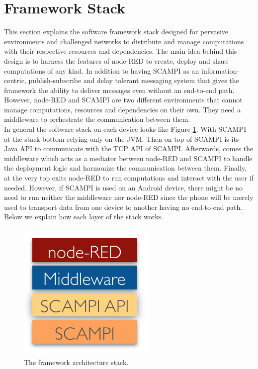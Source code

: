 \section{Framework Stack}\label{sec:stack}
This section explains the software framework stack designed for pervasive environments and challenged networks to distribute and manage computations with their respective resources and dependencies.  The main idea behind this design is to harness the features of node-RED to create, deploy and share computations of any kind. In addition to having SCAMPI as an information-centric, publish-subscribe and delay tolerant messaging system that gives the framework the ability to deliver messages even without an end-to-end path. However, node-RED and SCAMPI are two different environments that cannot manage computations, resources and dependencies on their own. They need a middleware to orchestrate the communication between them.\\


\noindent In general the software stack on each device  looks like Figure \ref{fig:stack}. With SCAMPI at the stack bottom relying only on the JVM. Then on top of SCAMPI is its Java API to communicate with the TCP API of SCAMPI. Afterwards, comes the middleware which acts as a mediator between node-RED and SCAMPI to handle the deployment logic and harmonize the communication between them. Finally, at the very top exits node-RED to run computations and interact with the user if needed. However, if SCAMPI is used on an Android device, there might be no need to run neither the middleware nor node-RED since the phone will be  merely used to transport data from one device to another having no end-to-end path. Below we explain how each layer  of the stack works.
\begin{figure}[H]
	\centering
	\includegraphics[scale=0.8]{images/stack.png}
	\caption{The framework architecture stack.  }
	\label{fig:stack}
\end{figure}



